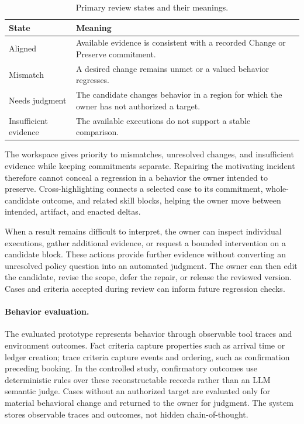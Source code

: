 \begin{table}[t]
    \caption{Primary review states and their meanings.}
    \label{tab:review-states}
    \small
    \begin{tabularx}{\columnwidth}{@{}p{}Y@{}}
        \toprule
        \textbf{State} & \textbf{Meaning} \\
        \midrule
        Aligned & Available evidence is consistent with a recorded Change or Preserve commitment. \\
        Mismatch & A desired change remains unmet or a valued behavior regresses. \\
        Needs judgment & The candidate changes behavior in a region for which the owner has not authorized a target. \\
        Insufficient evidence & The available executions do not support a stable comparison. \\
        \bottomrule
    \end{tabularx}
\end{table}

The workspace gives priority to mismatches, unresolved changes, and
insufficient evidence while keeping commitments separate. Repairing the
motivating incident therefore cannot conceal a regression in a behavior the
owner intended to preserve. Cross-highlighting connects a selected case to its
commitment, whole-candidate outcome, and related skill blocks, helping the
owner move between intended, artifact, and enacted deltas.

When a result remains difficult to interpret, the owner can inspect individual
executions, gather additional evidence, or request a bounded intervention on a
candidate block. These actions provide further evidence without converting an
unresolved policy question into an automated judgment. The owner can then edit
the candidate, revise the scope, defer the repair, or release the reviewed
version. Cases and criteria accepted during review can inform future
regression checks.

\paragraph{Behavior evaluation.}
The evaluated prototype represents behavior through observable tool traces and
environment outcomes. Fact criteria capture properties such as arrival time or
ledger creation; trace criteria capture events and ordering, such as
confirmation preceding booking. In the controlled study, confirmatory outcomes
use deterministic rules over these reconstructable records rather than an LLM
semantic judge. Cases without an authorized target are evaluated only for
material behavioral change and returned to the owner for judgment. The system
stores observable traces and outcomes, not hidden chain-of-thought.

